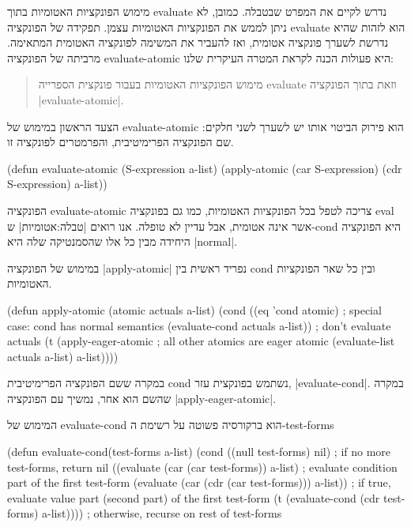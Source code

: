 מימוש הפונקציות האטומיות בתוך evaluate נדרש לקיים את המפרט שבטבלה. כמובן, לא
ניתן לממש את הפונקציות האטומיות עצמן. תפקידה של הפונקציה evaluate הוא לזהות
שהיא נדרשת לשערך פונקציה אטומית, ואז להעביר את המשימה לפונקציה האטומית המתאימה.
מרביתה של הפונקציה evaluate-atomic היא פעולות הכנה לקראת המטרה העיקרית שלנו:
\begin{quote}
  מימוש הפונקציות האטומיות בעבור פונקצית הספרייה evaluate וזאת בתוך הפונקציה
  \E|evaluate-atomic|.
\end{quote}

הצעד הראשון במימוש של evaluate-atomic הוא פירוק הביטוי אותו יש לשערך לשני
חלקים: שם הפונקציה הפרימיטיבית, והפרמטרים לפונקציה זו.
\begin{KERNEL}
(defun evaluate-atomic (S-expression a-list)
  (apply-atomic (car S-expression) (cdr S-expression) a-list))
\end{KERNEL}

הפונקציה evaluate-atomic צריכה לטפל בכל הפונקציות האטומיות, כמו גם בפונקציה
eval אשר אינה אטומית, אבל עדיין לא טופלה. אנו רואים |טבלה:אטומיות| ש-cond
היא הפונקציה היחידה מבין כל אלו שהסמנטיקה שלה היא \E|normal|.

\minipage\textwidth
במימוש של הפונקציה \E|apply-atomic| נפריד ראשית בין cond ובין כל שאר הפונקציות
האטומיות.
\begin{KERNEL}
(defun apply-atomic (atomic actuals a-list)
  (cond ((eq 'cond atomic) ; special case: cond has normal semantics
            (evaluate-cond actuals a-list)) ; don't evaluate actuals
        (t (apply-eager-atomic ; all other atomics are eager
              atomic
              (evaluate-list actuals a-list)
              a-list))))
\end{KERNEL}
\endminipage

במקרה ששם הפונקציה הפרימיטיבית cond נשתמש בפונקצית עזר, \E|evaluate-cond|. במקרה
שהשם הוא אחר, נמשיך עם הפונקציה \E|apply-eager-atomic|.

המימוש של evaluate-cond הוא ברקורסיה פשוטה על רשימת ה-test-forms
\begin{KERNEL}
(defun evaluate-cond(test-forms a-list)
  (cond ((null test-forms) nil) ; if no more test-forms, return nil
        ((evaluate (car (car test-forms)) a-list) ; evaluate condition part of the first test-form
        (evaluate (car (cdr (car test-forms))) a-list)) ; if true, evaluate value part (second part) of the first test-form
        (t (evaluate-cond (cdr test-forms) a-list)))) ; otherwise, recurse on rest of test-forms
\end{KERNEL}

